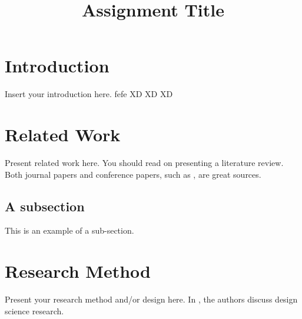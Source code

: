 \documentclass[fleqn,10pt]{wlscirep}
\title{Assignment Title}
\author{}
\begin{document}





\flushbottom
\maketitle


\section{Introduction}
Insert your introduction here.
fefe XD XD XD 
\section{Related Work}
Present related work here. 
You should read \cite{Webster2002-pw} on presenting a literature review.
Both journal papers and conference papers, such as \cite{Dingsoyr2014-xt}, are great sources.

\subsection{A subsection}
This is an example of a sub-section.

\section{Research Method}
Present your research method and/or design here. 
In \cite{Hevner2010-yw}, the authors discuss design science research.
\end{document}

